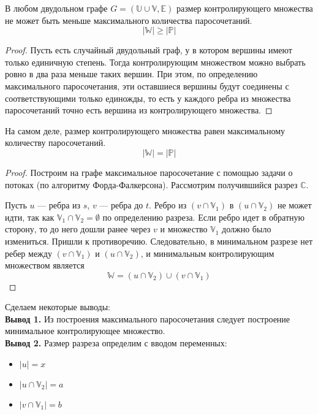 \documentclass[russian]{lecture-notes}
\begin{document}
	\begin{proposition}
		В любом двудольном графе $G = (\mathbb{U} \cup \mathbb{V}, \mathbb{E})$ размер контролирующего множества не может быть меньше максимального количества паросочетаний.
		$$|\mathbb{W}| \geq |\mathbb{P}|$$
	\end{proposition}
	
	\begin{proof}
		Пусть есть случайный двудольный граф, у в котором вершины имеют только единичную степень. Тогда контролирующим множеством можно выбрать ровно в два раза меньше таких вершин. При этом, по определению максимального паросочетания, эти оставшиеся вершины будут соединены с соответствующими только единожды, то есть у каждого ребра из множества паросочетаний точно есть вершина из контролирующего множества.
	\end{proof}
	
	\begin{proposition}
		На самом деле, размер контролирующего множества равен максимальному количеству 
		паросочетаний.
		$$|\mathbb{W}| = |\mathbb{P}|$$
	\end{proposition}
	
	\begin{proof}
		Построим на графе максимальное паросочетание с помощью задачи о потоках (по алгоритму Форда-Фалкерсона). Рассмотрим получившийся разрез $\mathbb{C}$.
		
		Пусть $u$ --- ребра из $s$, $v$ --- ребра до $t$. Ребро из $(v \cap \mathbb{V}_1)$ в $(u \cap \mathbb{V}_2)$ не может идти, так как $\mathbb{V}_1 \cap \mathbb{V}_2 = \emptyset$ по определению разреза. Если ребро идет в обратную сторону, то до него дошли ранее через $v$ и множество $\mathbb{V}_1$ должно было измениться. Пришли к противоречию. Следовательно, в минимальном разрезе нет ребер между $(v \cap \mathbb{V}_1)$ и $(u \cap \mathbb{V}_2)$, и минимальным контролирующим множеством является
		$$\mathbb{W} = (u \cap \mathbb{V}_2) \cup (v \cap \mathbb{V}_1)$$
	\end{proof}
	Сделаем некоторые выводы:\\
	\textbf{Вывод 1.} Из построения максимального паросочетания следует построение минимальное контролирующее множество.\\
	\textbf{Вывод 2.} Размер разреза определим с вводом переменных:
	\begin{itemize}
		\item $|u| = x$
		\item $|u \cap \mathbb{V}_2| = a$
		\item $|v \cap \mathbb{V}_1| = b$
	\end{itemize}
	
\end{document}
